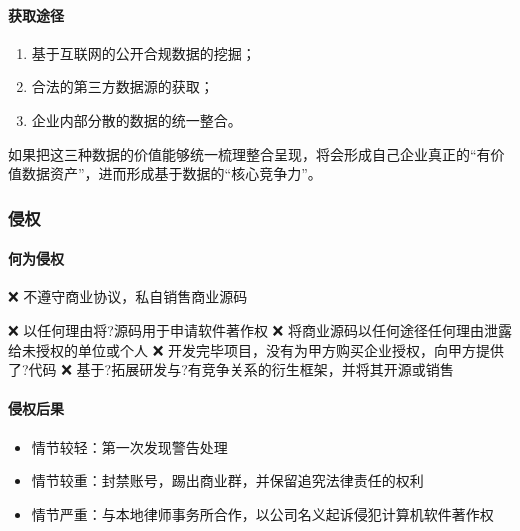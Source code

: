 \documentclass[letterpaper,10pt,english]{sphinxmanual}
\begin{document}
\paragraph{获取途径}
\label{\detokenize{chapter_data_dive/compliance_data:id3}}\begin{enumerate}
%
\item {} 
基于互联网的公开合规数据的挖掘；

\item {} 
合法的第三方数据源的获取；

\item {} 
企业内部分散的数据的统一整合。

\end{enumerate}

如果把这三种数据的价值能够统一梳理整合呈现，将会形成自己企业真正的“有价值数据资产”，进而形成基于数据的“核心竞争力”。%
\begin{footnote}[908]\sphinxAtStartFootnote
{}
%
\end{footnote}


\subsubsection{侵权}
\label{\detokenize{chapter_data_dive/pirate:id1}}\label{\detokenize{chapter_data_dive/pirate::doc}}

\paragraph{何为侵权}
\label{\detokenize{chapter_data_dive/pirate:id2}}
❌
不遵守商业协议，私自销售商业源码%
\begin{footnote}[909]\sphinxAtStartFootnote
{}
%
\end{footnote}
❌ 以任何理由将?源码用于申请软件著作权 ❌
将商业源码以任何途径任何理由泄露给未授权的单位或个人 ❌
开发完毕项目，没有为甲方购买企业授权，向甲方提供了?代码 ❌
基于?拓展研发与?有竞争关系的衍生框架，并将其开源或销售


\paragraph{侵权后果}
\label{\detokenize{chapter_data_dive/pirate:id3}}\begin{itemize}
\item {} 
情节较轻：第一次发现警告处理

\item {} 
情节较重：封禁账号，踢出商业群，并保留追究法律责任的权利

\item {} 
情节严重：与本地律师事务所合作，以公司名义起诉侵犯计算机软件著作权

\end{itemize}
\end{document}
